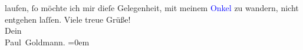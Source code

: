                laufen, ſo möchte ich mir dieſe Gelegenheit, mit meinem \textcolor{blue}{Onkel}{}\ledrightnote{{$\rightarrow$}\textcolor{blue}{Fedor Mamroth}} zu wandern, nicht entgehen laſſen.\pend
           \pstart
           Viele treue Grüße! {\\[\baselineskip]}Dein {\\[\baselineskip]}\spacefill\mbox{Paul Goldmann.}\pend
           \leftskip=0em{}\endnumbering{}\begin{anhang}\end{anhang}
      